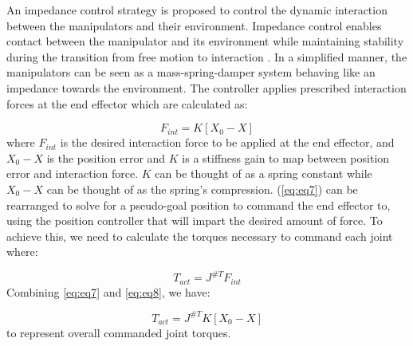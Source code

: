 

An impedance control strategy is proposed to control the dynamic interaction between the manipulators and their environment. Impedance control enables contact between the manipulator and its environment while maintaining stability during the transition from free motion to interaction \cite{Hogan1984}. In a simplified manner, the manipulators can be seen as a mass-spring-damper system behaving like an impedance towards the environment. The controller applies prescribed interaction forces at the end effector which are calculated as:

\begin{equation}
 	F_{int}=K[X_0-X]
	\label{eq:eq7}
\end{equation}
where $F_{int}$ is the desired interaction force to be applied at the end effector, and $X_0-X$ is the position error and $K$ is a stiffness gain to map between position error and interaction force. $K$ can be thought of as a spring constant while $X_0-X$ can be thought of as the spring's compression. (\ref{eq:eq7}) can be rearranged to solve for a pseudo-goal position to command the end effector to, using the position controller that will impart the desired amount of force. To achieve this, we need to calculate the torques necessary to command each joint where:

\begin{equation}
	T_{act}=J^{\#T}F_{int}
	\label{eq:eq8}
\end{equation}
Combining \ref{eq:eq7} and \ref{eq:eq8}, we have:

\begin{equation}
	T_{act}=J^{\#T}K[X_0-X]
	\label{eq:eq9}
\end{equation}
to represent overall commanded joint torques.